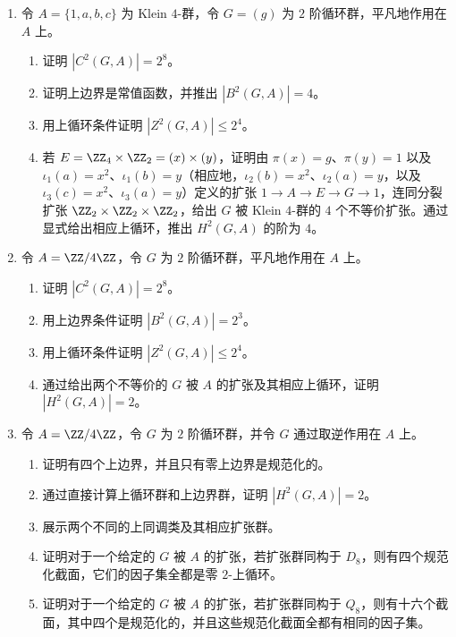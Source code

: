 \begin{enumerate}
  \item 令 $A=\{1,a,b,c\}$ 为 Klein $4$-群，令 $G=(g)$ 为 $2$ 阶循环群，平凡地作用在 $A$ 上。
  \begin{enumerate}[label=(\alph*)]
    \item 证明 $|C^2(G,A)|=2^8$。
    \item 证明上边界是常值函数，并推出 $|B^2(G,A)|=4$。
    \item 用上循环条件证明 $|Z^2(G,A)|\leq2^4$。
    \item 若 $E=\ZZ_4\times\ZZ_2=(x)\times(y)$，证明由 $\pi(x)=g$、$\pi(y)=1$ 以及 $\iota_1(a)=x^2$、$\iota_1(b)=y$（相应地，$\iota_2(b)=x^2$、$\iota_2(a)=y$，以及 $\iota_3(c)=x^2$、$\iota_3(a)=y$）定义的扩张 $1\to A\to E\to G\to1$，连同分裂扩张 $\ZZ_2\times\ZZ_2\times\ZZ_2$，给出 $G$ 被 Klein $4$-群的 $4$ 个不等价扩张。通过显式给出相应上循环，推出 $H^2(G,A)$ 的阶为 $4$。
  \end{enumerate}

  \item 令 $A=\ZZ/4\ZZ$，令 $G$ 为 $2$ 阶循环群，平凡地作用在 $A$ 上。
  \begin{enumerate}[label=(\alph*)]
    \item 证明 $|C^2(G,A)|=2^8$。
    \item 用上边界条件证明 $|B^2(G,A)|=2^3$。
    \item 用上循环条件证明 $|Z^2(G,A)|\leq2^4$。
    \item 通过给出两个不等价的 $G$ 被 $A$ 的扩张及其相应上循环，证明 $|H^2(G,A)|=2$。
  \end{enumerate}

  \item 令 $A=\ZZ/4\ZZ$，令 $G$ 为 $2$ 阶循环群，并令 $G$ 通过取逆作用在 $A$ 上。
  \begin{enumerate}[label=(\alph*)]
    \item 证明有四个上边界，并且只有零上边界是规范化的。
    \item 通过直接计算上循环群和上边界群，证明 $|H^2(G,A)|=2$。
    \item 展示两个不同的上同调类及其相应扩张群。
    \item 证明对于一个给定的 $G$ 被 $A$ 的扩张，若扩张群同构于 $D_8$，则有四个规范化截面，它们的因子集全都是零 $2$-上循环。
    \item 证明对于一个给定的 $G$ 被 $A$ 的扩张，若扩张群同构于 $Q_8$，则有十六个截面，其中四个是规范化的，并且这些规范化截面全都有相同的因子集。
  \end{enumerate}


\end{enumerate}
